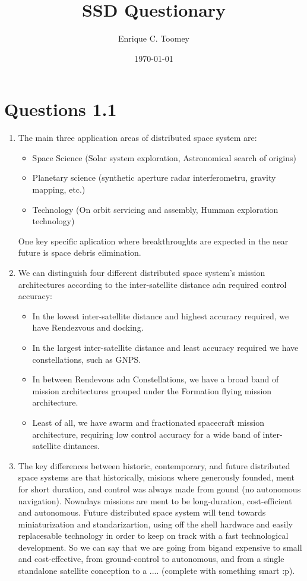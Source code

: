 \documentclass[a4paper]{article}
\begin{document}
\title{SSD Questionary}
\author{Enrique C. Toomey}
\date{\today}
\maketitle


\section{Questions 1.1}
\begin{enumerate}[label=\emph{\alph*)},series=preguntas1_1]
  \item The main three application areas of distributed space system are:
  \begin{itemize}
    \item Space Science (Solar system exploration, Astronomical search of origins)
    \item Planetary science (synthetic aperture radar interferometru, gravity mapping, etc.)
    \item Technology (On orbit servicing and assembly, Humman exploration technology)
  \end{itemize}
  One key specific aplication where breakthroughts are expected in the near future is space debris elimination.
  \item We can distinguish four different distributed space system's  mission architectures according to the inter-satellite distance adn required control accuracy:
  \begin{itemize}
    \item In the lowest inter-satellite distance and highest accuracy required, we have Rendezvous and docking.
    \item In the largest inter-satellite distance and least accuracy required we have constellations, such as GNPS.
    \item In between Rendevous adn Constellations, we have a broad band of mission architectures grouped under the Formation flying mission architecture.
    \item Least of all, we have swarm and fractionated spacecraft mission architecture, requiring low control accuracy for a wide band of inter-satellite dintances.
  \end{itemize}

  \item The key differences between historic, contemporary, and future distributed space systems are that historically, misions where generously founded, ment for short duration, and control was always made from gound (no autonomous navigation). Nowadays missions are ment to be long-duration, cost-efficient and autonomous. Future distributed space system will tend towards miniaturization and standarizartion, using off the shell hardware and easily replacesable technology in order to keep on track with a fast technological development. So we can say that we are going from bigand expensive to small and cost-effective, from ground-control to autonomous, and from a single standalone satellite conception to a .... (complete with something smart :p).


\end{enumerate}
\end{document}
